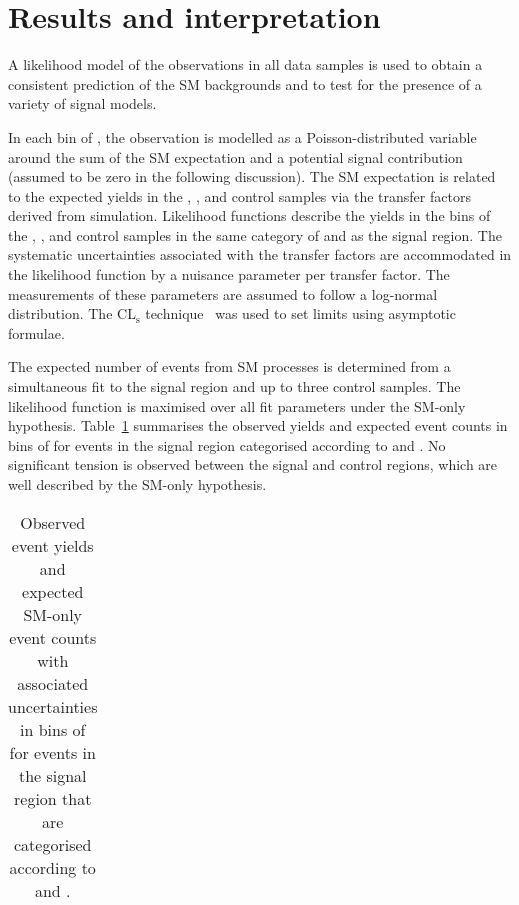 \section{Results and interpretation}
\label{sec:interpretation}

A likelihood model of the observations in all data samples is
used to obtain a consistent prediction of the SM backgrounds and to
test for the presence of a variety of signal models.

In each bin of \scalht, the observation is modelled as a
Poisson-distributed variable around the sum of the SM expectation and a
potential signal contribution (assumed to be zero in the following
discussion). The SM expectation is related to the expected yields in
the \mj, \mmj, and \gj control samples via the transfer factors
derived from simulation. Likelihood functions describe the yields in the \scalht bins
of the \mj, \mmj, and \gj control samples in the same category of
\njet and \nb as the signal region. The systematic uncertainties
associated with the transfer factors are accommodated in the
likelihood function by a nuisance parameter per transfer factor. The
measurements of these parameters are assumed to follow a log-normal
distribution. The CL$_{\mathrm{s}}$ technique~\cite{read, Cowan:2010js} was used to set limits using asymptotic formulae.

The expected number of events from SM processes is determined from a
simultaneous fit to the signal region and up to three control
samples. The likelihood function is maximised over all fit parameters
under the SM-only hypothesis.
Table~\ref{tab:fit-result} summarises 
the observed yields and expected event counts in bins of \scalht for events
in the signal region categorised according to \njet and \nb. 
No significant tension is observed between the signal and control
regions, which are well described by the SM-only hypothesis.

\begin{table}[h!]
  \caption{Observed event yields and expected SM-only event counts
    with associated uncertainties in bins of \scalht for events in the
    signal region that are categorised according to \njet and \nb.}
  \label{tab:fit-result}
  \centering
  \tiny
  \begin{tabular}{ llllllllllllll }
    \hline
    \hline
  \end{tabular}
\end{table}

